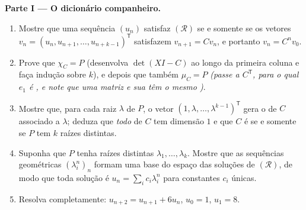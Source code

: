 \begin{problem}
\medskip
\noindent\textbf{Parte I --- O dicionário companheiro.}
\begin{enumerate}
  \item Mostre que uma sequência $(u_n)$ satisfaz $(\mathcal R)$ se
        e somente se os vetores $v_n = (u_n, u_{n+1}, \dots,
        u_{n+k-1})^{\mathsf T}$ satisfazem $v_{n+1} = Cv_n$, e portanto
        $v_n = C^n v_0$.
  \item Prove que $\chi_C = P$ (desenvolva $\det(XI - C)$ ao longo da
        primeira coluna e faça indução sobre $k$), e depois que também
        $\mu_C = P$ \emph{(passe a $C^{\mathsf T}$, para o qual $e_1$
        é , e note que uma matriz e sua  têm
        o mesmo )}.
  \item Mostre que, para cada raiz $\lambda$ de $P$, o vetor
        $(1, \lambda, \dots, \lambda^{k-1})^{\mathsf T}$ gera
        o  de $C$ associado a $\lambda$; deduza que
        \emph{todo}  de $C$ tem dimensão $1$ e
        que $C$ é  se e somente se $P$ tem $k$
        raízes distintas.
  \item Suponha que $P$ tenha raízes distintas $\lambda_1, \dots,
        \lambda_k$. Mostre que as sequências geométricas
        $(\lambda_i^n)_n$ formam uma base do espaço das soluções
        de $(\mathcal R)$, de modo que toda solução é $u_n = \sum_i
        c_i\lambda_i^n$ para constantes $c_i$ únicas.
  \item Resolva completamente: $u_{n+2} = u_{n+1} + 6u_n$, $u_0 = 1$,
        $u_1 = 8$.
\end{enumerate}


\end{problem}
